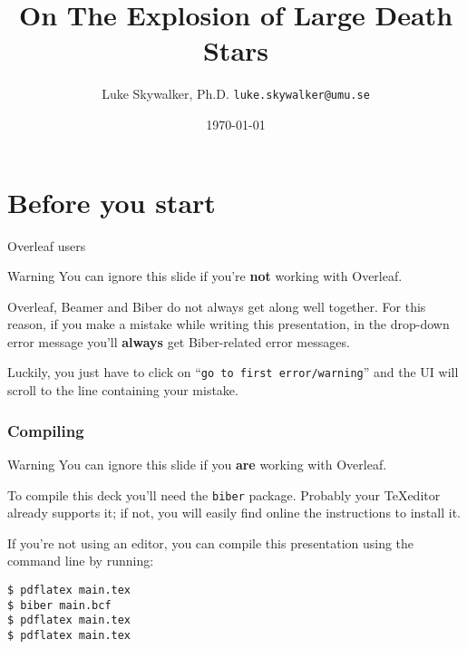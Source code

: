 \documentclass[usenames,dvipsnames,10pt]{beamer}
\title[Umeå University Unofficial Beamer Theme]{On The Explosion of Large Death Stars}
\date[\today]{\small\today}
\author[Luke Skywalker]{
  Luke Skywalker, Ph.D.
  \pdfnewline
  \texttt{luke.skywalker@umu.se}
}
\institute{Department of Physics, Umeå University }
\begin{document}
\begin{frame}
\titlepage
\end{frame}

\begin{frame}{\contentsname}
\tableofcontents
\end{frame}

\section{Before you start}
\begin{frame}{Overleaf users}

\begin{alertblock}{Warning}
You can ignore this slide if you're \textbf{not} working with Overleaf.
\end{alertblock}

\vskip 0.5cm

Overleaf, Beamer and Biber do not always get along well together. For this reason, if you make a mistake while writing this presentation, in the drop-down error message you'll \textbf{always} get Biber-related error messages.

\vskip 0.5cm

Luckily, you just have to click on ``\texttt{go to first error/warning}'' and the UI will scroll to the line containing your mistake.

\end{frame}

\begin{frame}[fragile]
\frametitle{Compiling}

\begin{alertblock}{Warning}
You can ignore this slide if you \textbf{are} working with Overleaf.
\end{alertblock}

To compile this deck you'll need the \texttt{biber} package. Probably your \TeX editor already supports it; if not, you will easily find online the instructions to install it.

\vskip 0.5cm

If you're not using an editor, you can compile this presentation using the command line by running:

\begin{verbatim}
$ pdflatex main.tex
$ biber main.bcf
$ pdflatex main.tex
$ pdflatex main.tex
\end{verbatim}


\end{frame}
\end{document}
